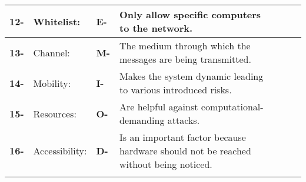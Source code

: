 \documentclass{report}
\begin{document}
\begin{tabular}{V{2.5}p{0.5cm}|p{3cm}V{2.5}p{0.5cm}|p{10cm}V{2.5}}
			\hline
			\bfseries 12- & Whitelist: & \bfseries E- & Only allow specific computers to the network. \\
			\hline
			\bfseries 13- & Channel: & \bfseries M- & The medium through which the messages are being transmitted. \\
			\hline
			\bfseries 14- & Mobility: & \bfseries I- & Makes the system dynamic leading to various introduced risks. \\
			\hline
			\bfseries 15- & Resources: & \bfseries O- & Are helpful against computational-demanding attacks.\\
			\hline
			\bfseries 16- & Accessibility: & \bfseries D- & Is an important factor because hardware should not be reached without being noticed. \\
		\end{tabular}
	\closesection
\end{document}
